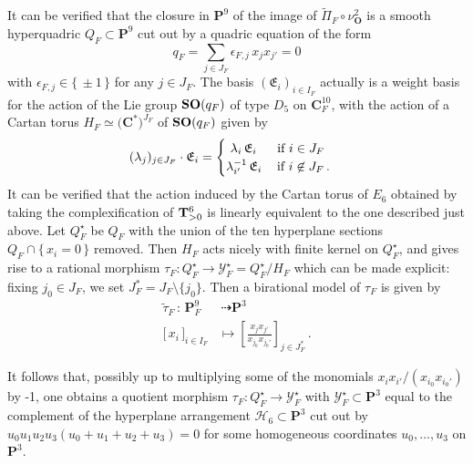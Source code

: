 \documentclass[11pt]{amsart}
\begin{document}
  It can be verified that the closure in $\mathbf P^9$ of the image of  $\tilde \Pi_F \circ \nu_{\mathbf O}^2$ is a smooth hyperquadric $Q_F\subset \mathbf P^9$ 
  cut out by a quadric equation of the form 
  $$q_F=\sum_{j\in J_F} \epsilon_{F,j} \,x_{j} x_{j'}=0$$ with  
 $\epsilon_{F,j}\in \{\,\pm 1\,\}$ for any $j\in J_F$. 
The basis $(\mathfrak E_i)_{i\in I_F}$ actually is a weight basis for the action of   the Lie group ${\bf SO}(q_F)$ of type $D_5$ on $\mathbf C^{10}_F$, with the action of a Cartan torus $H_F\simeq \big( \mathbf C^*\big)^{J_F}$ of  ${\bf SO}(q_F)$  given by 
$$(\lambda_j)_{j\in J_F}\cdot \mathfrak E_i= \begin{cases}\, \, 
\lambda_i\, \mathfrak E_i \hspace{0.45cm} \mbox{ if } i\in J_F
\\
\lambda_{i'}^{-1}\, \mathfrak E_i  \hspace{0.3cm} \mbox{ if } i\not \in J_F\, .  
\end{cases}
 $$
 It can be verified that the action induced by the Cartan torus of $E_6$ obtained by taking the complexification of ${\bf T}^6_{>0}$ is linearly equivalent to the one described just above.  Let $Q_F^\star$ be $Q_F$ with the union of the ten hyperplane sections $Q_F\cap \{\,x_i=0\,\}$ removed. Then $H_F$ acts nicely with finite kernel on $Q_F^\star$, and gives rise 
 to a rational morphism $\tau_F:  Q_F^\star\longrightarrow \boldsymbol{\mathcal Y}_F^\star=Q_F^\star/H_F$ which can be made explicit:  fixing $j_0\in J_F$, we set $J_{F}^*=J_F\setminus \{j_0 \}$. 
 Then a birational model of $\tau_F$ is given by  
\begin{align} %
\label{Eq:Tilde-tau-F} %
 \tilde \tau_F \, :\,  \mathbf P^9_F & \, \dashrightarrow \mathbf P^3\\
\big[\,x_i\,\big]_{i\in I_F} & \longmapsto \left[ \frac{x_{j}x_{j'}}{x_{j_0}x_{j_0'}} \right]_{j\in J_{F}^*}\, .
\nonumber 
 \end{align} %
 
 It follows that,  possibly up to multiplying some of the monomials 
 ${x_{i}x_{i'}}/({x_{i_0}x_{i_0'}})$ by -1, one obtains a quotient morphism 
 $\tau_F: Q_F^\star\longrightarrow \boldsymbol{\mathcal Y}_F^\star$ with $\boldsymbol{\mathcal Y}_F^\star\subset \mathbf P^3$ equal to the complement of the hyperplane arrangement 
$\mathcal H_6\subset \mathbf P^3$ 
 cut 
 out by $u_0u_1u_2u_3(u_0+u_1+u_2+u_3)=0$ for some homogeneous coordinates $u_0,\ldots,u_3$ on $\mathbf P^3$. 
  
\end{document}
